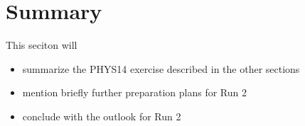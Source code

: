 \section{Summary}
\label{sec:summary}

This seciton will

\begin{itemize}
  \item summarize the PHYS14 exercise described in the other sections
  \item mention briefly further preparation plans for Run 2
  \item conclude with the outlook for Run 2
\end{itemize}


